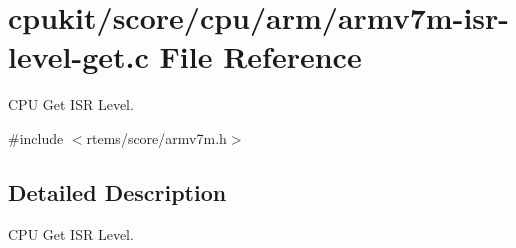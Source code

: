 \hypertarget{armv7m-isr-level-get_8c}{}\section{cpukit/score/cpu/arm/armv7m-\/isr-\/level-\/get.c File Reference}
\label{armv7m-isr-level-get_8c}


C\+PU Get I\+SR Level.  


{\ttfamily \#include $<$rtems/score/armv7m.\+h$>$}\newline


\subsection{Detailed Description}
C\+PU Get I\+SR Level. 

